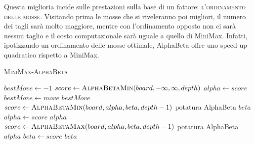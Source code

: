 \documentclass{article}
\begin{document}
Questa miglioria incide sulle prestazioni sulla base di un fattore: \textsc{l'ordinamento delle mosse}.
Visitando prima le mosse che si riveleranno poi migliori, il numero dei tagli sarà molto maggiore,
mentre con l'ordinamento opposto non ci sarà nessun taglio e il costo computazionale sarà uguale a 
quello di MiniMax. Infatti, ipotizzando un ordinamento delle mosse ottimale, AlphaBeta offre uno
speed-up quadratico rispetto a MiniMax.
\pagebreak

\begin{algorithm}[H]
    \caption{\textsc{MiniMax-AlphaBeta}}
    \label{alg:minimax}
    \begin{algorithmic}[H]
        \State $bestMove \gets -1$
            \State $score \gets \Call{AlphaBetaMin}{board,-\infty,\infty,depth}$
              \State $alpha \gets score$
              \State $bestMove \gets move$
            \EndIf
      \EndFor
      \State \Return $bestMove$
      \EndProcedure \\
          \State \Return {}
        \EndIf
            \State $score \gets \Call{AlphaBetaMin}{board,alpha,beta,depth-1}$
            \Comment potatura AlphaBeta
              \State \Return $beta$
            \EndIf
              \State $alpha \gets score$
            \EndIf
      \EndFor
      \State \Return $alpha$
      \EndProcedure \\
          \State \Return {}
        \EndIf
            \State $score \gets \Call{AlphaBetaMax}{board,alpha,beta,depth-1}$
            \Comment potatura AlphaBeta
              \State \Return $alpha$
            \EndIf
              \State $beta \gets score$
            \EndIf
      \EndFor
      \State \Return $beta$
      \EndProcedure
    \end{algorithmic}
  \end{algorithm}

\pagebreak
\end{document}
